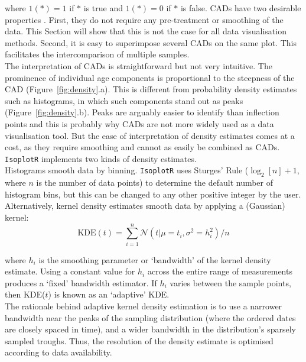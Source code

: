 \begin{refsection}
\noindent where $1(\ast) = 1$ if $\ast$ is true and $1(\ast) = 0$ if
$\ast$ is false. CADs have two desirable properties
\citep{vermeesch2007a}.  First, they do not require any pre-treatment
or smoothing of the data.  This Section will show that this is not the
case for all data visualisation methods. Second, it is easy to
superimpose several CADs on the same plot. This facilitates the
intercomparison of multiple samples.\\

The interpretation of CADs is straightforward but not very
intuitive. The prominence of individual age components is proportional
to the steepness of the CAD (Figure~\ref{fig:density}.a). This is
different from probability density estimates such as histograms, in
which such components stand out as peaks
(Figure~\ref{fig:density}.b). Peaks are arguably easier to identify
than inflection points and this is probably why CADs are not more
widely used as a data visualisation tool. But the ease of
interpretation of density estimates comes at a cost, as they require
smoothing and cannot as easily be combined as CADs. \texttt{IsoplotR}
implements two kinds of density estimates.\\

Histograms smooth data by binning. \texttt{IsoplotR} uses Sturges'
Rule ($\log_2[n]+1$, where $n$ is the number of data points) to
determine the default number of histogram bins, but this can be
changed to any other positive integer by the user. Alternatively,
kernel density estimates \citep[KDEs][]{vermeesch2012b} smooth data by
applying a (Gaussian) kernel:
\begin{equation}
  \mathrm{KDE}(t) = \sum_{i=1}^{n}\mathcal{N}\left(t | \mu=t_i,
  \sigma^2=h_i^2\right)/n
  \label{eq:KDE}
\end{equation}

\noindent where $h_i$ is the smoothing parameter or `bandwidth' of the
kernel density estimate. Using a constant value for $h_i$ across the
entire range of measurements produces a `fixed' bandwidth estimator.
If $h_i$ varies between the sample points, then KDE($t$) is known as
an `adaptive' KDE.\\

The rationale behind adaptive kernel density estimation is to use a
narrower bandwidth near the peaks of the sampling distribution (where
the ordered dates are closely spaced in time), and a wider bandwidth
in the distribution's sparsely sampled troughs. Thus, the resolution
of the density estimate is optimised according to data
availability.\\


\end{refsection}
